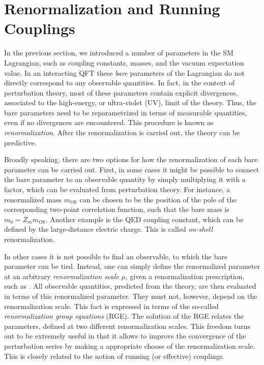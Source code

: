 \section{Renormalization and Running Couplings}
\label{Renormalization}
\label{sec:runcoup}


In the previous section, we introduced a number of parameters in the SM Lagrangian, such as coupling constants, masses, and the vacuum expectation value.
In an interacting QFT these \emph{bare} parameters of the Lagrangian do not directly correspond to any observable quantities.
In fact, in the context of perturbation theory, most of these parameters contain explicit divergences,
associated to the high-energy, or ultra-violet (UV), limit of the theory.
Thus, the bare parameters need to be reparametrized in terms of measurable quantities,
even if no divergences are encountered.
This procedure is known as \emph{renormalization}.
After the renormalization is carried out, the theory can be predictive.

Broadly speaking, there are two options for how the renormalization of each bare parameter can be carried out.
First, in some cases it might be possible to connect the bare parameter to an observable quantity by simply multiplying it with a factor, which can be evaluated from perturbation theory.
For instance, a renormalized mass $m_\text{OS}$ can be chosen to be the position of the pole of the corresponding two-point correlation function,
such that the bare mass is 
$
  m_0 = Z_m m_\text{OS}.
$
Another example is the QED coupling constant, which can be defined by the large-distance electric charge.
This is called \emph{on-shell} renormalization.

In other cases it is not possible to find an observable, to which the bare parameter can be tied.
Instead, one can simply define the renormalized parameter at an arbitrary \emph{renormalization scale} $\mu$, given a renormalization prescription, such as \MSbar.
All observable quantities, predicted from the theory, are then evaluated in terms of this renormalized parameter.
They must not, however, depend on the renormalization scale.
This fact is expressed in terms of the so-called \emph{renormalization group equations} (RGE).
The solution of the RGE relates the parameters, defined at two different renormalization scales.
This freedom turns out to be extremely useful in that it allows to improve the convergence of the perturbation series
by making a appropriate choose of the renormalization scale.
This is closely related to the notion of running (or effective) couplings.

